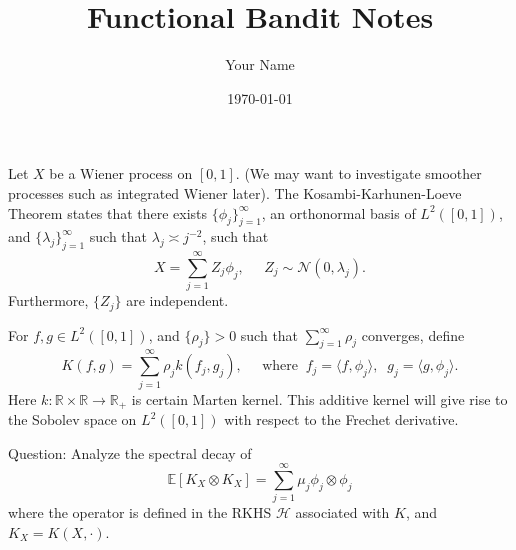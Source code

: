 \documentclass[11pt,a4paper]{article}
\title{Functional Bandit Notes}
\author{Your Name}
\date{\today}
\theoremstyle{definition}
\theoremstyle{plain}
\theoremstyle{remark}
\newcommand{\lt}{L^2([0,1])}
\newcommand{\mH}{\mathcal H}
\begin{document}
Let $X$ be a Wiener process on $[0,1]$. (We may want to investigate smoother processes such as integrated Wiener later). The Kosambi-Karhunen-Loeve Theorem states that there exists $\{\phi_j\}_{j=1}^{\infty}$, an orthonormal basis of 
$\lt$, and $\{\lambda_j\}_{j=1}^{\infty}$ such that $\lambda_j\asymp j^{-2}$, such that 
$$
X = \sum_{j=1}^{\infty} Z_j \phi_j,\;\;\;\;\;Z_j\sim\mathcal N(0,\lambda_j).
$$
Furthermore, $\{Z_j\}$ are independent.

For $f,g\in\lt$, and $\{\rho_j\}>0$ such that $\sum_{j=1}^{\infty}\rho_j$ converges, define
$$
K(f,g) = \sum_{j=1}^{\infty} \rho_j k(f_j,g_j),\;\;\;\;\;\text{where}\;\; f_j=\langle f,\phi_j\rangle,\;\; g_j=\langle g, \phi_j\rangle.
$$
Here $k:\mathbb R\times\mathbb R\to\mathbb R_+$ is certain Marten kernel. This additive kernel will give rise to the Sobolev space on $\lt$ with respect to the Frechet derivative.

Question: Analyze the spectral decay of 
$$
\mathbb E[K_X\otimes K_X] = \sum_{j=1}^{\infty} \mu_j\phi_j\otimes\phi_j
$$
where the operator is defined in the RKHS $\mH$ associated with $K$, and $K_X = K(X,\cdot)$.



\end{document}
